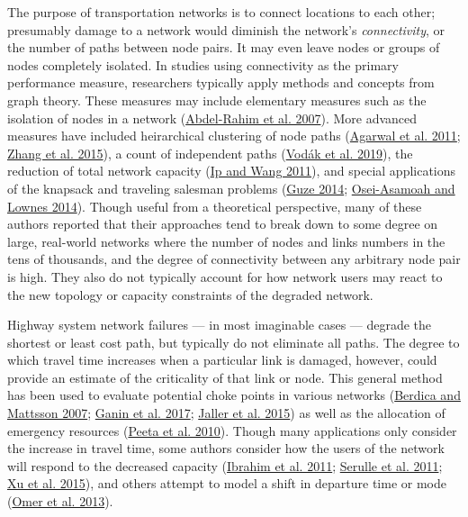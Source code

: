 \documentclass[]{ascelike-new}
\begin{document}
The purpose of transportation networks is to connect locations to each
other; presumably damage to a network would diminish the network's
\emph{connectivity}, or the number of paths between node pairs. It may
even leave nodes or groups of nodes completely isolated. In studies
using connectivity as the primary performance measure, researchers
typically apply methods and concepts from graph theory. These measures
may include elementary measures such as the isolation of nodes in a
network (\protect\hyperlink{ref-abdel2007}{Abdel-Rahim et al. 2007}).
More advanced measures have included heirarchical clustering of node
paths (\protect\hyperlink{ref-agarwal2011}{Agarwal et al. 2011};
\protect\hyperlink{ref-zhang2015}{Zhang et al. 2015}), a count of
independent paths (\protect\hyperlink{ref-vodak2019}{Vodák et al.
2019}), the reduction of total network capacity
(\protect\hyperlink{ref-ip2011}{Ip and Wang 2011}), and special
applications of the knapsack and traveling salesman problems
(\protect\hyperlink{ref-guze2014}{Guze 2014};
\protect\hyperlink{ref-osei2014}{Osei-Asamoah and Lownes 2014}). Though
useful from a theoretical perspective, many of these authors reported
that their approaches tend to break down to some degree on large,
real-world networks where the number of nodes and links numbers in the
tens of thousands, and the degree of connectivity between any arbitrary
node pair is high. They also do not typically account for how network
users may react to the new topology or capacity constraints of the
degraded network.

Highway system network failures --- in most imaginable cases --- degrade
the shortest or least cost path, but typically do not eliminate all
paths. The degree to which travel time increases when a particular link
is damaged, however, could provide an estimate of the criticality of
that link or node. This general method has been used to evaluate
potential choke points in various networks
(\protect\hyperlink{ref-berdica2007}{Berdica and Mattsson 2007};
\protect\hyperlink{ref-ganin2017}{Ganin et al. 2017};
\protect\hyperlink{ref-jaller2015}{Jaller et al. 2015}) as well as the
allocation of emergency resources
(\protect\hyperlink{ref-peeta2010}{Peeta et al. 2010}). Though many
applications only consider the increase in travel time, some authors
consider how the users of the network will respond to the decreased
capacity (\protect\hyperlink{ref-ibrahim2011}{Ibrahim et al. 2011};
\protect\hyperlink{ref-serulle2011}{Serulle et al. 2011};
\protect\hyperlink{ref-xu2015}{Xu et al. 2015}), and others attempt to
model a shift in departure time or mode
(\protect\hyperlink{ref-omer2013}{Omer et al. 2013}).
\end{document}
